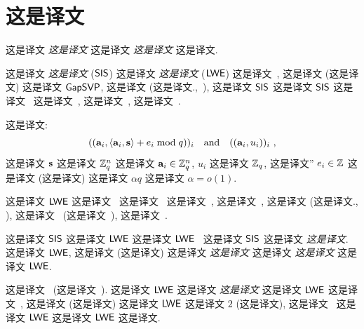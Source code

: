 
\section{这是译文}
\label{sec:introduction}




这是译文 \emph{这是译文} 这是译文 \emph{这是译文} 这是译文.

这是译文 \emph{这是译文} ($\mathsf{SIS}$) 这是译文 \emph{这是译文} ($\mathsf{LWE}$) 这是译文~\cite{Ajtai96}, 这是译文 (这是译文) 这是译文 $\mathsf{GapSVP}$, 这是译文 (这是译文.,~\cite{DBLP:journals/siamcomp/MicciancioR07}), 这是译文 $\mathsf{SIS}$ 这是译文 $\mathsf{SIS}$ 这是译文~\cite{Ajtai96} 这是译文~\cite{DBLP:journals/eccc/ECCC-TR96-042}, 这是译文~\cite{DBLP:conf/crypto/MicciancioV03,DBLP:conf/pkc/Lyubashevsky08,DBLP:conf/asiacrypt/KawachiTX08}, 这是译文~\cite{DBLP:conf/stoc/GentryPV08,DBLP:conf/eurocrypt/CashHKP10,DBLP:conf/pkc/Boyen10,DBLP:conf/eurocrypt/MicciancioP12,DBLP:conf/eurocrypt/Lyubashevsky12}. 

这是译文: \[
(( \mathbf{a}_i, \langle\mathbf{{a}}_i, \mathbf{{s}}\rangle+e_i \bmod q))_{i}
\quad \text{and} \quad
(( \mathbf{a}_i, u_i ))_{i}~,
\] 这是译文 $\mathbf{s}$ 这是译文 $\mathbb{Z}_q^n$ 这是译文 $\mathbf{a}_i \in \mathbb{Z}_q^n$,  $u_i$ 这是译文 $\mathbb{Z}_q$, 这是译文'' $e_i \in \mathbb{Z}$ 这是译文 (这是译文) 这是译文 $\alpha q$ 这是译文 $\alpha = o(1)$.


这是译文 $\mathsf{LWE}$ 这是译文~\cite{DBLP:journals/jacm/Regev09,DBLP:conf/crypto/PeikertVW08,DBLP:conf/ctrsa/LindnerP11} 这是译文~\cite{DBLP:conf/stoc/PeikertW08,DBLP:conf/stoc/Peikert09,DBLP:conf/eurocrypt/MicciancioP12} 这是译文~\cite{DBLP:conf/crypto/PeikertVW08}, 这是译文~\cite{DBLP:conf/stoc/GentryPV08,DBLP:conf/eurocrypt/CashHKP10,DBLP:conf/eurocrypt/AgrawalBB10,DBLP:conf/crypto/AgrawalBB10}, 这是译文 (这是译文., \cite{DBLP:conf/tcc/AkaviaGV09,DBLP:conf/crypto/ApplebaumCPS09,DBLP:conf/innovations/GoldwasserKPV10}), 这是译文~\cite{DBLP:conf/focs/BrakerskiV11,DBLP:conf/innovations/BrakerskiGV12,DBLP:conf/crypto/Brakerski12} (这是译文~\cite{DBLP:conf/stoc/Gentry09}), 这是译文~\cite{DBLP:conf/focs/KlivansS06}.

这是译文 $\mathsf{SIS}$ 这是译文 $\mathsf{LWE}$ 这是译文 $\mathsf{LWE}$~\cite{DBLP:journals/jacm/Regev09} 这是译文 $\mathsf{SIS}$ 这是译文 \emph{这是译文}. 这是译文 $\mathsf{LWE}$, 这是译文 (这是译文) 这是译文 \emph{这是译文} 这是译文 \emph{这是译文} 这是译文 $\mathsf{LWE}$.

这是译文~\cite{DBLP:conf/stoc/Peikert09} (这是译文~\cite{DBLP:conf/crypto/LyubashevskyM09}).  这是译文 $\mathsf{LWE}$ 这是译文 \emph{这是译文} 这是译文 $\mathsf{LWE}$ 这是译文~\cite{DBLP:conf/focs/KlivansS06}, 这是译文 (这是译文) 这是译文 $\mathsf{LWE}$ 这是译文 $2$ (这是译文), 这是译文~\cite{DBLP:conf/stoc/Peikert09} 这是译文 $\mathsf{LWE}$ 这是译文 $\mathsf{LWE}$ 这是译文.


